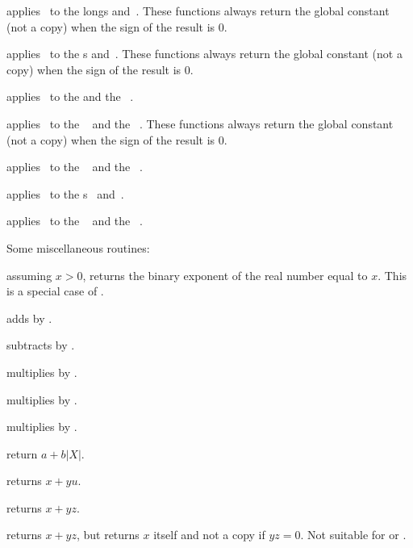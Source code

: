  applies \op\ to the longs
 and~. These functions always return the global constant
 (not a copy) when the sign of the result is $0$.

 applies \op\ to the
s  and~. These functions always return the global
constant  (not a copy) when the sign of the result is $0$.

 applies \op\ to the
  and the ~.

 applies \op\ to the
~ and the ~. These functions always return
the global constant  (not a copy) when the sign of the result
is $0$.

 applies \op\ to the
~ and the ~.

 applies \op\ to the
s~ and~.

 applies \op\ to the
~ and the ~.

\noindent Some miscellaneous routines:

 assuming $x > 0$, returns the binary exponent of
the real number equal to $x$. This is a special case of .

 adds  by .

 subtracts  by .

 multiplies  by .

 multiplies  by .

 multiplies  by .

 return $a + b|X|$.

 returns $x +yu$.

 returns $x + yz$.

 returns $x + yz$, but
returns $x$ itself and not a copy if $yz = 0$. Not suitable for
 or .

